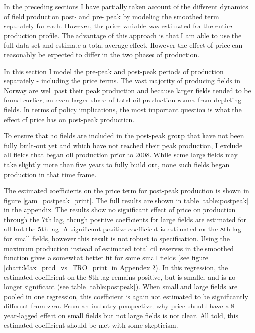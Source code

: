 \documentclass[12pt]{article}
\begin{document}
In the preceding sections I have partially taken account of the different dynamics of field production post- and pre- peak by modeling the smoothed term separately for each.  However, the price variable was estimated for the entire production profile.  The advantage of this approach is that I am able to use the full data-set and estimate a total average effect.  However the effect of price can reasonably be expected to differ in the two phases of production.  

In this section I model the pre-peak and post-peak periods of production separately - including the price terms. The vast majority of producing fields in Norway are well past their peak production and because larger fields tended to be found earlier, an even larger share of total oil production comes from depleting fields.  In terms of policy implications, the most important question is what the effect of price has on post-peak production. 

To ensure that no fields are included in the post-peak group that have not been fully built-out yet and which have not reached their peak production, I exclude all fields that began oil production prior to 2008.  While some large fields may take slightly more than five years to fully build out, none such fields began production in that time frame.

 The estimated coefficients on the price term for post-peak production is shown in figure \ref{gam_postpeak_print}.  The full results are shown in table \ref{table:postpeak} in the appendix.  The results show no significant effect of price on production through the 7th lag, though positive coefficients for large fields are estimated for all but the 5th lag.  A significant positive coefficient is estimated on the 8th lag for small fields, however this result is not robust to specification.  Using the maximum production instead of estimated total oil reserves in the smoothed function gives a somewhat better fit for some small fields (see figure \ref{chart:Max_prod_vs_TRO_print} in Appendex 2).  In this regression, the estimated coefficient on the 8th lag remains positive, but is smaller and is no longer significant (see table \ref{table:postpeak}).  When small and large fields are pooled in one regression, this coefficient is again not estimated to be significantly different from zero.  From an industry perspective, why price should have a 8-year-lagged effect on small fields but not large fields is not clear.  All told, this estimated coefficient should be met with some skepticism.  
\end{document}
